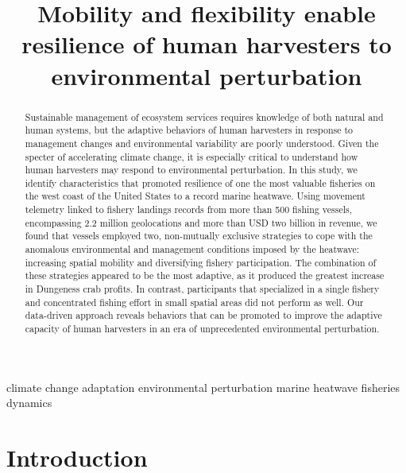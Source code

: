 \documentclass[]{elsarticle} %
\begin{document}
\begin{frontmatter}

  \title{Mobility and flexibility enable resilience of human harvesters to
environmental perturbation}
      
  \begin{abstract}
  Sustainable management of ecosystem services requires knowledge of both
  natural and human systems, but the adaptive behaviors of human
  harvesters in response to management changes and environmental
  variability are poorly understood. Given the specter of accelerating
  climate change, it is especially critical to understand how human
  harvesters may respond to environmental perturbation. In this study, we
  identify characteristics that promoted resilience of one the most
  valuable fisheries on the west coast of the United States to a record
  marine heatwave. Using movement telemetry linked to fishery landings
  records from more than 500 fishing vessels, encompassing 2.2 million
  geolocations and more than USD two billion in revenue, we found that
  vessels employed two, non-mutually exclusive strategies to cope with the
  anomalous environmental and management conditions imposed by the
  heatwave: increasing spatial mobility and diversifying fishery
  participation. The combination of these strategies appeared to be the
  most adaptive, as it produced the greatest increase in Dungeness crab
  profits. In contrast, participants that specialized in a single fishery
  and concentrated fishing effort in small spatial areas did not perform
  as well. Our data-driven approach reveals behaviors that can be promoted
  to improve the adaptive capacity of human harvesters in an era of
  unprecedented environmental perturbation.
  \end{abstract}
   \begin{keyword} climate change adaptation \textbar{} environmental perturbation
\textbar{} marine heatwave \textbar{} fisheries dynamics\end{keyword}
 \end{frontmatter}

\hypertarget{intro}{%
\section{Introduction}\label{intro}}
\end{document}
